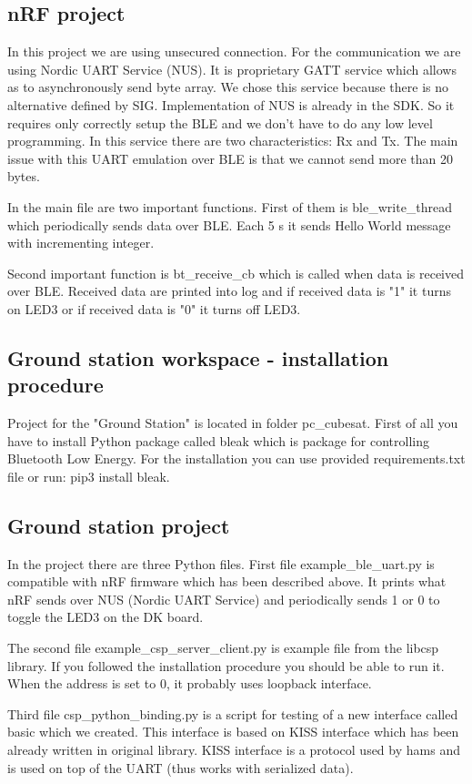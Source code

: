 \documentclass[conference]{IEEEtran}
\begin{document}
\subsection{nRF project}
In this project we are using unsecured connection. For the communication we are using Nordic UART Service (NUS). It is proprietary GATT service which allows as to asynchronously send byte array. We chose this service because there is no alternative defined by SIG. Implementation of NUS is already in the SDK. So it requires only correctly setup the BLE and we don't have to do any low level programming. In this service there are two characteristics: Rx and Tx. The main issue with this UART emulation over BLE is that we cannot send more than 20 bytes.

In the main file are two important functions. First of them is ble\_write\_thread which periodically sends data over BLE. Each 5 s it sends Hello World message with incrementing integer.

Second important function is bt\_receive\_cb which is called when data is received over BLE. Received data are printed into log and if received data is "1" it turns on LED3 or if received data is "0" it turns off LED3.

\subsection{Ground station workspace - installation procedure}
Project for the "Ground Station" is located in folder pc\_cubesat. First of all you have to install Python package called bleak which is package for controlling Bluetooth Low Energy. For the installation you can use provided requirements.txt file or run: pip3 install bleak.

\subsection{Ground station project}
In the project there are three Python files. First file example\_ble\_uart.py is compatible with nRF firmware which has been described above. It prints what nRF sends over NUS (Nordic UART Service) and periodically sends 1 or 0 to toggle the LED3 on the DK board.

The second file example\_csp\_server\_client.py is example file from the libcsp library. If you followed the installation procedure you should be able to run it. When the address is set to 0, it probably uses loopback interface.

Third file csp\_python\_binding.py is a script for testing of a new interface called basic which we created. This interface is based on KISS interface which has been already written in original library. KISS interface is a protocol used by hams and is used on top of the UART (thus works with serialized data).
\end{document}
